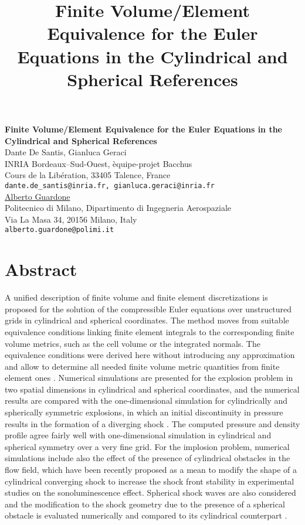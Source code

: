 \title{Finite Volume/Element Equivalence for the Euler Equations in the Cylindrical and Spherical References}
\author{} \institute{}

\begin{center}

\textbf{\Large Finite Volume/Element Equivalence for the Euler Equations in the Cylindrical and Spherical References}\\
\vspace{10mm}
{\large Dante De Santis, Gianluca Geraci}\\
INRIA Bordeaux--Sud-Ouest, \`equipe-projet Bacchus\\
Cours de la Lib\'eration, 33405 Talence, France\\
{\tt dante.de\_santis@inria.fr, gianluca.geraci@inria.fr}\\
\vspace{4mm}
{\large \underline{Alberto Guardone}}\\
Politecnico di Milano, Dipartimento di Ingegneria Aerospaziale\\
Via La Masa 34, 20156 Milano, Italy\\
{\tt alberto.guardone@polimi.it}

\end{center}

\section*{Abstract}

A unified description of finite volume and finite element discretizations is proposed for the solution of the compressible Euler equations over unstructured grids in cylindrical and spherical coordinates. The method moves from suitable equivalence conditions linking finite element integrals  to the corresponding finite volume metrics, such as the cell volume or the integrated normals. The equivalence conditions were derived here without introducing any approximation and allow to determine all needed finite volume metric quantities from finite element ones \cite{selmin,ddga}. Numerical simulations are presented for the explosion problem in two spatial dimensions in cylindrical and spherical coordinates, and the numerical results are compared with the one-dimensional simulation for cylindrically and spherically symmetric explosions, in which an initial discontinuity in pressure results in the formation of a diverging shock \cite{sedov}. The computed pressure and density profile agree fairly well with one-dimensional simulation in cylindrical and spherical symmetry over a very fine grid. For the implosion problem, numerical simulations include also the effect of the presence of cylindrical obstacles in the flow field, which have been recently proposed as a mean to modify the shape of a cylindrical converging shock to increase the shock front stability in experimental studies on the sonoluminescence effect. Spherical shock waves are also considered and the modification to the shock geometry due to the presence of a spherical obstacle is evaluated numerically and compared to its cylindrical counterpart \cite{chenal}.

